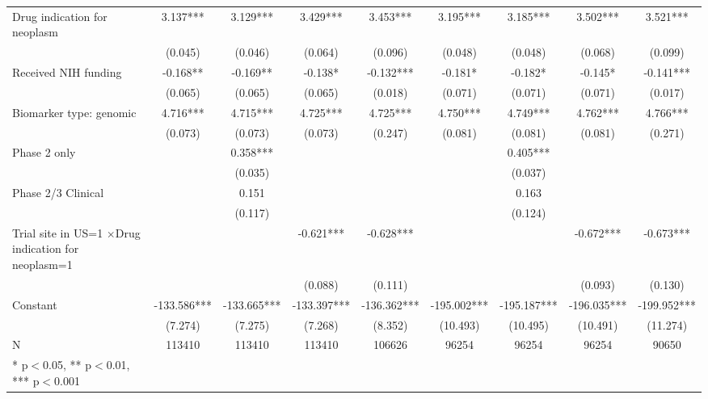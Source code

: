 \begin{table}[htb]
\begin{tabular}{l*{8}c}
Drug indication for neoplasm&       3.137***&       3.129***&       3.429***&       3.453***&       3.195***&       3.185***&       3.502***&       3.521*** \\
                    &     (0.045)   &     (0.046)   &     (0.064)   &     (0.096)   &     (0.048)   &     (0.048)   &     (0.068)   &     (0.099)    \\
Received NIH funding&      -0.168** &      -0.169** &      -0.138*  &      -0.132***&      -0.181*  &      -0.182*  &      -0.145*  &      -0.141***\\
                    &     (0.065)   &     (0.065)   &     (0.065)   &     (0.018)   &     (0.071)   &     (0.071)   &     (0.071)   &     (0.017)   \\
Biomarker type: genomic&       4.716***&       4.715***&       4.725***&       4.725***&       4.750***&       4.749***&       4.762***&       4.766***\\
                    &     (0.073)   &     (0.073)   &     (0.073)   &     (0.247)   &     (0.081)   &     (0.081)   &     (0.081)   &     (0.271)   \\
Phase 2 only        &               &       0.358***&               &               &               &       0.405***&               &               \\
                    &               &     (0.035)   &               &               &               &     (0.037)   &               &               \\
Phase 2/3 Clinical  &               &       0.151   &               &               &               &       0.163   &               &               \\
                    &               &     (0.117)   &               &               &               &     (0.124)   &               &               \\
\shortstack[l]{Trial site in US=1\\$\times$Drug indication for neoplasm=1}&               &               &      -0.621***&      -0.628***&               &               &      -0.672***&      -0.673***\\
                    &               &               &     (0.088)   &     (0.111)   &               &               &     (0.093)   &     (0.130)   \\
Constant            &    -133.586***&    -133.665***&    -133.397***&    -136.362***&    -195.002***&    -195.187***&    -196.035***&    -199.952***\\
                    &     (7.274)   &     (7.275)   &     (7.268)   &     (8.352)   &    (10.493)   &    (10.495)   &    (10.491)   &    (11.274)   \\
N                   &      113410   &      113410   &      113410   &      106626   &       96254   &       96254   &       96254   &       90650   \\
* p$<$0.05, ** p$<$0.01, *** p$<$0.001 \\

\end{tabular}
\end{table}

